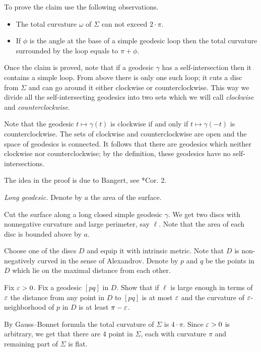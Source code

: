 To prove the claim use the following observations.
\begin{itemize}
\item The total curvature $\omega$ of $\Sigma$ can not exceed $2\cdot\pi$.
\item If $\phi$ is the angle at the base of a simple geodesic loop then the total curvature surrounded by the loop equals to $\pi+\phi$.
\end{itemize}

Once the claim is proved, note that if a geodesic $\gamma$ has a self-intersection
then it contains a simple loop.
From above there is only one such loop;
it cuts a disc from $\Sigma$ 
and can go around it either clockwise or counterclockwise.
This way we divide all the self-intersecting geodesics 
into two sets which we will call \emph{clockwise} and \emph{counterclockwise}.

Note that the geodesic $t\mapsto \gamma(t)$ is clockwise 
if and only if 
$t\mapsto \gamma(-t)$
is counterclockwise.
The sets of clockwise and counterclockwise are open and the space of geodesics is connected. 
It follows that there are geodesics which neither clockwise nor counterclockwise;
by the definition, these geodesics have no self-intersections.

The idea in the proof is due to Bangert, see \cite{bangert}*{Cor. 2}.

\textit{Long geodesic.}
Denote by $a$ the area of the surface.

Cut the surface along a long closed simple geodesic $\gamma$.
We get two discs with nonnegative curvature and large perimeter, 
say $\ell$.
Note that the area of each disc is bounded above by $a$.

Choose one of the discs $D$ and equip it with intrinsic metric.
Note that $D$ is non-negatively curved in the sense of Alexandrov.
Denote by $p$ and $q$ be the points in $D$ which lie on the maximal distance from each other.

Fix $\varepsilon>0$.
Fix a geodesic $[pq]$ in $D$.
Show that if $\ell$ is large enough in terms of $\varepsilon$ 
the distance from any point in $D$ to $[pq]$ is at most $\varepsilon$
and the curvature of $\varepsilon$-neighborhood of $p$ in $D$
is at least $\pi-\varepsilon$.

By Gauss--Bonnet formula the total curvature of $\Sigma$ is $4\cdot\pi$.
Since $\varepsilon>0$ is arbitrary, we get that there are 4 point in $\Sigma$, each with curvature $\pi$
and remaining part of $\Sigma$ is flat.

